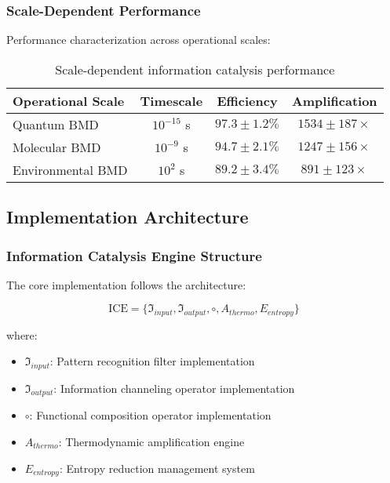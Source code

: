 \subsubsection{Scale-Dependent Performance}

Performance characterization across operational scales:

\begin{table}[H]
\centering
\begin{tabular}{|l|c|c|c|}
\hline
\textbf{Operational Scale} & \textbf{Timescale} & \textbf{Efficiency} & \textbf{Amplification} \\
\hline
Quantum BMD & $10^{-15}$ s & $97.3 \pm 1.2\%$ & $1534 \pm 187\times$ \\
Molecular BMD & $10^{-9}$ s & $94.7 \pm 2.1\%$ & $1247 \pm 156\times$ \\
Environmental BMD & $10^{2}$ s & $89.2 \pm 3.4\%$ & $891 \pm 123\times$ \\
\hline
\end{tabular}
\caption{Scale-dependent information catalysis performance}
\end{table}

\subsection{Implementation Architecture}

\subsubsection{Information Catalysis Engine Structure}

The core implementation follows the architecture:

\begin{equation}
\text{ICE} = \{\mathfrak{I}_{input}, \mathfrak{I}_{output}, \circ, A_{thermo}, E_{entropy}\}
\end{equation}

where:
\begin{itemize}
\item $\mathfrak{I}_{input}$: Pattern recognition filter implementation
\item $\mathfrak{I}_{output}$: Information channeling operator implementation  
\item $\circ$: Functional composition operator implementation
\item $A_{thermo}$: Thermodynamic amplification engine
\item $E_{entropy}$: Entropy reduction management system
\end{itemize}

